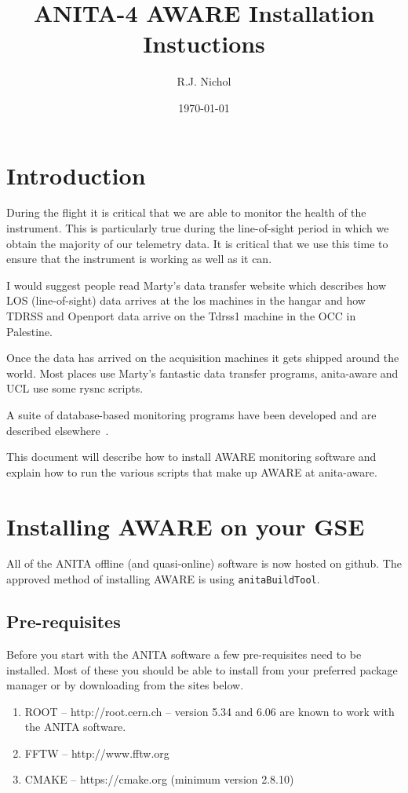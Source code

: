 \documentclass{article}
\begin{document}
\title{ANITA-4 AWARE Installation Instuctions}
\author{R.J. Nichol}
  
\date{\today}
\maketitle


\section{Introduction}
During the flight it is critical that we are able to monitor the health of the instrument. This is particularly true during the line-of-sight period in which we obtain the majority of our telemetry data. It is critical that we use this time to ensure that the instrument is working as well as it can.

I would suggest people read Marty's data transfer website which describes how LOS (line-of-sight) data arrives at the los machines in the hangar and how TDRSS and Openport data arrive on the Tdrss1 machine in the OCC in Palestine\cite{web:martyDataTransfer}.

Once the data has arrived on the acquisition machines it gets shipped around the world. Most places use Marty's fantastic data transfer programs, anita-aware and UCL use some rysnc scripts.

A suite of database-based monitoring programs have been developed and are described elsewhere~\cite{web:anitaMonitoring}.

This document will describe how to install AWARE monitoring software and explain how to run the various scripts that make up AWARE at anita-aware.

\section{Installing AWARE on your GSE}
All of the ANITA offline (and quasi-online) software is now hosted on github. The approved method of installing AWARE is using {\tt anitaBuildTool}.

\subsection{Pre-requisites}
Before you start with the ANITA software a few pre-requisites need to be installed. Most of these you should be able to install from your preferred package manager or by downloading from the sites below.
\begin{enumerate}
\item ROOT -- http://root.cern.ch  -- version 5.34 and 6.06 are known to work with the ANITA software.
\item FFTW -- http://www.fftw.org
\item CMAKE -- https://cmake.org  (minimum version 2.8.10)
\end{enumerate}
\end{document}
